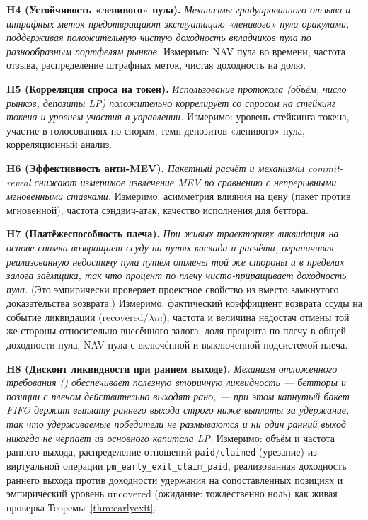 \documentclass{ledger}
\theoremstyle{plain}
\theoremstyle{remark}
\begin{document}
\textbf{H4 (Устойчивость «ленивого» пула).} \emph{Механизмы градуированного отзыва и
штрафных меток предотвращают эксплуатацию «ленивого» пула оракулами, поддерживая
положительную чистую доходность вкладчиков пула по разнообразным портфелям рынков.}
Измеримо: NAV пула во времени, частота отзыва, распределение штрафных меток, чистая
доходность на долю.

\textbf{H5 (Корреляция спроса на токен).} \emph{Использование протокола (объём, число
рынков, депозиты LP) положительно коррелирует со спросом на стейкинг токена и уровнем
участия в управлении.} Измеримо: уровень стейкинга токена, участие в голосованиях по
спорам, темп депозитов «ленивого» пула, корреляционный анализ.

\textbf{H6 (Эффективность анти-MEV).} \emph{Пакетный расчёт и механизмы commit-reveal
снижают измеримое извлечение MEV по сравнению с непрерывными мгновенными ставками.}
Измеримо: асимметрия влияния на цену (пакет против мгновенной), частота сэндвич-атак,
качество исполнения для беттора.

\textbf{H7 (Платёжеспособность плеча).} \emph{При живых траекториях ликвидация на
основе снимка возвращает ссуду на путях каскада и расчёта, ограничивая реализованную
недостачу пула путём отмены той же стороны и в пределах залога заёмщика, так что
процент по плечу чисто-приращивает доходность пула.} (Это эмпирически проверяет
проектное свойство из  вместо замкнутого доказательства возврата.)
Измеримо: фактический коэффициент возврата ссуды на событие ликвидации
($\text{recovered}/\lambda m$), частота и величина недостач отмены той же стороны
относительно внесённого залога, доля процента по плечу в общей доходности пула, NAV
пула с включённой и выключенной подсистемой плеча.

\textbf{H8 (Дисконт ликвидности при раннем выходе).} \emph{Механизм отложенного
требования () обеспечивает полезную вторичную ликвидность ---
бетторы и позиции с плечом действительно выходят рано, --- при этом капнутый бакет
FIFO держит выплату раннего выхода строго ниже выплаты за удержание, так что
удерживаемые победители не размываются и ни один ранний выход никогда не черпает из
основного капитала LP.} Измеримо: объём и частота раннего выхода, распределение
отношений \texttt{paid}/\texttt{claimed} (урезание) из виртуальной операции
\texttt{pm\_early\_exit\_claim\_paid}, реализованная доходность раннего выхода против
доходности удержания на сопоставленных позициях и эмпирический уровень
$\text{uncovered}$ (ожидание: тождественно ноль) как живая проверка
Теоремы~\ref{thm:earlyexit}.
\end{document}
